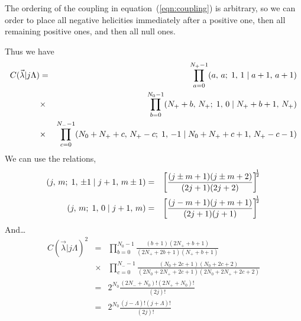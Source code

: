 \documentclass[a4paper]{article}
\newcommand{\cg}[6]{\ensuremath{(#1,\,#2;\;#3,\,#4\;|\;#5\ifthenelse{\equal{#6}{}}{}{,\,#6})}}
\begin{document}
The ordering of the coupling in equation~(\ref{eqn:coupling}) is
arbitrary, so we can order to place all negative helicities
immediately after a positive one, then all remaining positive ones,
and then all null ones.

Thus we have
\begin{eqnarray*}
  C(\vec\lambda|j\Lambda)
  & = &      \prod_{a=0}^{N_+-1} \cg{a}{a}{1}{1}{a+1}{a+1}\\
  & \times & \prod_{b=0}^{N_0-1} \cg{N_++b}{N_+}{1}{0}{N_++b+1}{N_+}\\
  & \times & \prod_{c=0}^{N_--1} \cg{N_0+N_++c}{N_+-c}{1}{-1}{N_0+N_++c+1}{N_+-c-1}
\end{eqnarray*}
We can use the relations,
\begin{eqnarray*}
  \cg{j}{m}{1}{\pm1}{j+1}{m\pm1} & = & \left[\frac{(j\pm m+1)(j\pm m+2)}{(2j+1)(2j+2)}\right]^{\!\!\frac{1}{2}}\\
  \cg{j}{m}{1}{0}{j+1}{m}   & = & \left[\frac{(j-m+1)(j+m+1)}{(2j+1)(j+1)}\right]^{\!\!\frac{1}{2}}\\
\end{eqnarray*}
And\dots
\begin{eqnarray*}
  C(\vec\lambda|j\Lambda)^2
  & = &      \prod_{b=0}^{N_0-1} \frac{(b+1)(2N_++b+1)}{(2N_++2b+1)(N_++b+1)}\\
  & \times & \prod_{c=0}^{N_--1} \frac{(N_0+2c+1)(N_0+2c+2)}{(2N_0+2N_++2c+1)(2N_0+2N_++2c+2)}\\
  & = & 2^{N_0} \frac{(2N_-+N_0)!(2N_++N_0)!}{(2j)!}\\
  & = & 2^{N_0} \frac{(j-\Lambda)!(j+\Lambda)!}{(2j)!}
\end{eqnarray*}
\end{document}
